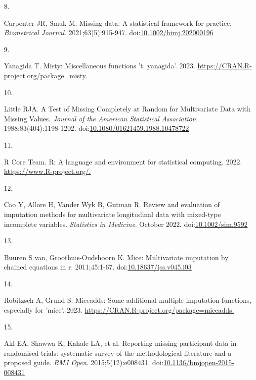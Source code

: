 \documentclass[
]{book}
\newlength{\cslhangindent}
\newlength{\csllabelwidth}
\newlength{\cslentryspacingunit} %
\newenvironment{CSLReferences}[2] %
 {%
  \setlength{\parindent}{0pt}
  \ifodd #1
  \let\oldpar\par
  \def\par{\hangindent=\cslhangindent\oldpar}
  \fi
  \setlength{\parskip}{#2\cslentryspacingunit}
 }%
 {}
\newcommand{\CSLLeftMargin}[1]{\parbox[t]{\csllabelwidth}{#1}}
\newcommand{\CSLRightInline}[1]{\parbox[t]{\linewidth - \csllabelwidth}{#1}\break}
\begin{document}
\begin{CSLReferences}{0}{0}
\leavevmode{}%
\CSLLeftMargin{8. }%
\CSLRightInline{Carpenter JR, Smuk M. Missing data: A statistical framework for practice. \emph{Biometrical Journal}. 2021;63(5):915-947. doi:\href{https://doi.org/10.1002/bimj.202000196}{10.1002/bimj.202000196}}

\leavevmode{}%
\CSLLeftMargin{9. }%
\CSLRightInline{Yanagida T. Misty: Miscellaneous functions 't. yanagida'. 2023. \href{https://CRAN.R-project.org/package=misty}{https://CRAN.R-project.org/package=misty.}}

\leavevmode{}%
\CSLLeftMargin{10. }%
\CSLRightInline{Little RJA. A Test of Missing Completely at Random for Multivariate Data with Missing Values. \emph{Journal of the American Statistical Association}. 1988;83(404):1198-1202. doi:\href{https://doi.org/10.1080/01621459.1988.10478722}{10.1080/01621459.1988.10478722}}

\leavevmode{}%
\CSLLeftMargin{11. }%
\CSLRightInline{R Core Team. R: A language and environment for statistical computing. 2022. \href{https://www.R-project.org/}{https://www.R-project.org/.}}

\leavevmode{}%
\CSLLeftMargin{12. }%
\CSLRightInline{Cao Y, Allore H, Vander Wyk B, Gutman R. Review and evaluation of imputation methods for multivariate longitudinal data with mixed{-}type incomplete variables. \emph{Statistics in Medicine}. October 2022. doi:\href{https://doi.org/10.1002/sim.9592}{10.1002/sim.9592}}

\leavevmode{}%
\CSLLeftMargin{13. }%
\CSLRightInline{Buuren S van, Groothuis-Oudshoorn K. {\textbraceleft}Mice{\textbraceright}: Multivariate imputation by chained equations in r. 2011;45:1-67. doi:\href{https://doi.org/10.18637/jss.v045.i03}{10.18637/jss.v045.i03}}

\leavevmode{}%
\CSLLeftMargin{14. }%
\CSLRightInline{Robitzsch A, Grund S. Miceadds: Some additional multiple imputation functions, especially for 'mice'. 2023. \href{https://CRAN.R-project.org/package=miceadds}{https://CRAN.R-project.org/package=miceadds.}}

\leavevmode{}%
\CSLLeftMargin{15. }%
\CSLRightInline{Akl EA, Shawwa K, Kahale LA, et al. Reporting missing participant data in randomised trials: systematic survey of the methodological literature and a proposed guide. \emph{BMJ Open}. 2015;5(12):e008431. doi:\href{https://doi.org/10.1136/bmjopen-2015-008431}{10.1136/bmjopen-2015-008431}}


\end{CSLReferences}
\end{document}
